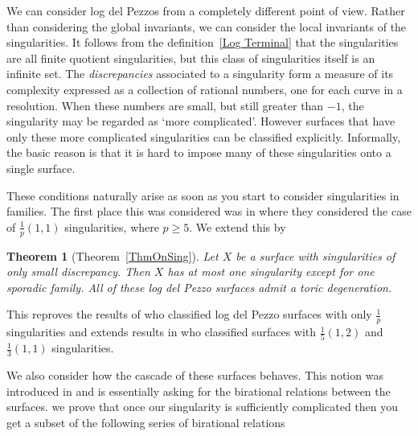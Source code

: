 \documentclass[12pt,a4paper]{book}      %
\newtheorem{thm}{Theorem}[section]
\theoremstyle{definition}
\begin{document}
We can consider log del Pezzos from a completely different point of view. Rather than considering the global invariants, we can consider the local invariants of the singularities. 
It follows from the definition~\ref{Log Terminal} that the singularities
are all finite quotient singularities, but this class of singularities itself is an infinite set. 
The {\em discrepancies} associated to a singularity form a measure of
its complexity expressed as a collection of rational numbers, one for each curve in a resolution. 
When these numbers are small, but still greater than $-1$, the singularity may be regarded as `more complicated'. 
However surfaces that have only these more complicated singularities can be classified explicitly. Informally,
the basic reason is that it is hard to impose many of these singularities onto a single surface.

These conditions naturally arise as soon as you start to consider singularities in families. The first place this was considered was in \cite{CP} where they considered the case of $\frac{1}{p}(1,1)$ singularities, where $p \geq 5$. We extend this by


\begin{thm}[Theorem~\ref{ThmOnSing}]
Let $X$ be a surface with singularities of only small discrepancy. Then $X$ has at most one singularity except for one sporadic family. All of these log del Pezzo surfaces admit a toric degeneration.
\end{thm}

This reproves the results of \cite{CP} who classified log del Pezzo surfaces with only $\frac{1}{p}$ singularities and extends results in \cite{Cuzz} who classified surfaces with $\frac{1}{5}(1,2)$  and $\frac{1}{3}(1,1)$ singularities.

We also consider how the cascade of these surfaces behaves. This notion was introduced in \cite{MR2053462} and is essentially asking for the birational relations between the surfaces. we prove that once our singularity is sufficiently complicated then you get a subset of the following series of birational relations
\end{document}
